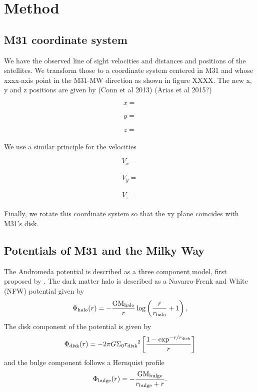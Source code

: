 \documentclass[useAMS,usenatbib]{mn2e}
\begin{document}
\section{Method}
\label{Method}
\subsection{M31 coordinate system}
We have the observed line of sight velocities and distances and positions of the satellites. 
We transform those to a coordinate system centered in M31 and whose xxxx-axis point in the M31-MW direction as shown in figure XXXX.
The new x, y and z positions are given by (Conn et al 2013) (Arias et al 2015?)\citep{2013ApJ...766..120C,2013Natur.493...62I}

\begin{equation}
x =
\end{equation}\\
\begin{equation}
y =
\end{equation}\\
\begin{equation}
z =
\end{equation}\\

We use a similar principle for the velocities 

\begin{equation}
V_x =
\end{equation}\\
\begin{equation}
V_y =
\end{equation}\\
\begin{equation}
V_z =
\end{equation}\\

Finally, we rotate this coordinate system so that the xy plane coincides with M31's disk.  

\subsection{Potentials of M31 and the Milky Way}
The Andromeda potential is described as a three component model, first proposed by \cite{2006MNRAS.366..996G}.  
The dark matter halo is described as a Navarro-Frenk and White (NFW) potential \citep{1997ApJ...490..493N} given by
\begin{equation}
\Phi_{\rm{halo}}(r)=-\frac{\rm{GM_{\rm{halo}}}}{r}\log \left(\frac{r}{r_{\rm{halo}}}+1\right),
\label{NFW}
\end{equation}   
The disk component of the potential is given by
\begin{equation}
\Phi_{\rm{disk}}(r)=-2{\pi}G\Sigma_{0}{r_{\rm{disk}}}^2\left[\frac{1-\exp^{-r/r_{\rm{disk}}}}{r}\right]
\end{equation}   
and the bulge component follows a Hernquist profile \citep{1990ApJ...356..359H}
\begin{equation}
\Phi_{\rm{bulge}}(r)=-\frac{\rm{GM_{{bulge}}}}{r_{\rm{bulge}}+r}\mbox{.}
\label{Hernquist}
\end{equation}\\
\end{document}
